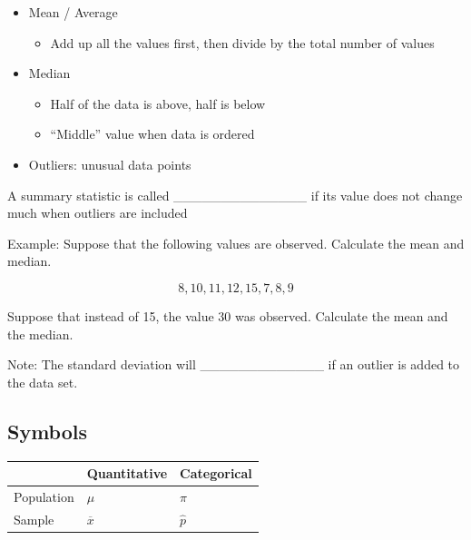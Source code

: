 \documentclass[
  letterpaper,
  DIV=11,
  numbers=noendperiod]{scrartcl}
\newcounter{none} %
\providecommand{\tightlist}{%
  \setlength{\itemsep}{0pt}\setlength{\parskip}{0pt}}
\begin{document}
\begin{itemize}
\item
  Mean / Average

  \begin{itemize}
  \tightlist
  \item
    Add up all the values first, then divide by the total number of
    values
  \end{itemize}
\item
  Median

  \begin{itemize}
  \item
    Half of the data is above, half is below
  \item
    ``Middle'' value when data is ordered
  \end{itemize}
\item
  Outliers: unusual data points
\end{itemize}

A summary statistic is called \_\_\_\_\_\_\_\_\_\_\_\_\_\_ if its value
does not change much when outliers are included

Example: Suppose that the following values are observed. Calculate the
mean and median.

\[
8,10,11,12,15,7,8,9
\]

\hfill\break
\hfill\break
\hfill\break
\hfill\break
\hfill\break

Suppose that instead of 15, the value 30 was observed. Calculate the
mean and the median.

\hfill\break
\hfill\break
\hfill\break
\hfill\break
\hfill\break

Note: The standard deviation will \_\_\_\_\_\_\_\_\_\_\_\_\_ if an
outlier is added to the data set.

\subsection{Symbols}\label{symbols}

{\def\LTcaptype{none} %
\begin{longtable}[]{@{}
  >{\raggedright\arraybackslash}p{}
  >{\centering\arraybackslash}p{}
  >{\centering\arraybackslash}p{}@{}}
\toprule\noalign{}
\begin{minipage}[b]{\linewidth}\raggedright
\end{minipage} & \begin{minipage}[b]{\linewidth}\centering
\textbf{Quantitative}
\end{minipage} & \begin{minipage}[b]{\linewidth}\centering
\textbf{Categorical}
\end{minipage} \\
\midrule\noalign{}
\endhead
\bottomrule\noalign{}
\endlastfoot
Population & \(\mu\) & \(\pi\) \\
Sample & \(\overline{x}\) & \(\widehat{p}\) \\
\end{longtable}
}
\end{document}
